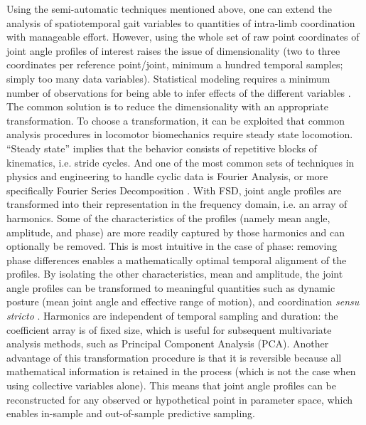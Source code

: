 Using the semi-automatic  techniques mentioned above, one can extend the analysis of spatiotemporal gait variables to quantities of intra-limb coordination with manageable effort.
However, using the whole set of raw point coordinates of joint angle profiles of interest raises the issue of dimensionality (two to three coordinates per reference point/joint, minimum a hundred temporal samples; simply too many data variables).
Statistical modeling requires a minimum number of observations for being able to infer effects of the different variables \citep{Frick1996,Maxwell2017,Riley2020,Austin2015}.
The common solution is to reduce the dimensionality with an appropriate transformation.
To choose a transformation, it can be exploited that common analysis procedures in locomotor biomechanics require steady state locomotion.
``Steady state'' implies that the behavior consists of repetitive blocks of kinematics, i.e. stride cycles.
And one of the most common sets of techniques in physics and engineering to handle cyclic data is Fourier Analysis, or more specifically Fourier Series Decomposition \citep[FSD;][]{Mielke2019,Webb2007,Fourier1822,Bracewell2000,Gray1995,Pike2002}.
With FSD, joint angle profiles are transformed into their representation in the frequency domain, i.e. an array of harmonics.
Some of the characteristics of the profiles (namely mean  angle, amplitude, and phase) are more readily captured by those harmonics and can optionally be removed.
This is most intuitive in the case of phase: removing phase differences enables a mathematically optimal temporal alignment of the profiles.
By isolating the other characteristics, mean and amplitude, the joint angle profiles can be transformed to meaningful quantities such as dynamic posture (mean joint angle and effective range of motion), and coordination \emph{sensu stricto} \citep[relative phase/joint timing and residual kinematics, \textit{cf.}][and Ch. \ref{cpt:fourier_review}]{Mielke2019}.
Harmonics are independent of temporal sampling and duration: the coefficient array is of fixed size, which is useful for subsequent multivariate analysis methods, such as Principal Component Analysis (PCA).
Another advantage of this transformation procedure is that it is reversible because all mathematical information is retained in the process (which is not the case when using collective variables alone).
This means that joint angle profiles can be reconstructed for any observed or hypothetical point in parameter space, which enables in-sample and out-of-sample predictive sampling.

